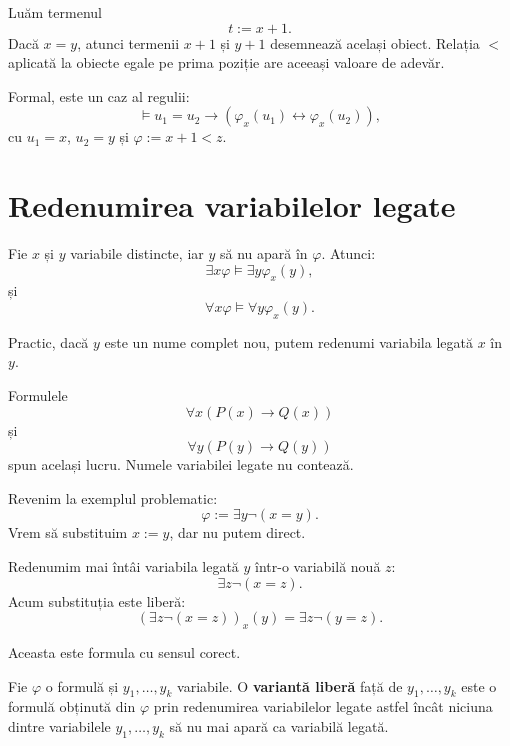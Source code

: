 \begin{solutie}
	Luăm termenul
	\[
		t := x+1.
	\]
	Dacă \(x=y\), atunci termenii \(x+1\) și \(y+1\) desemnează același obiect. Relația \(<\) aplicată la obiecte egale pe prima poziție are aceeași valoare de adevăr.

	Formal, este un caz al regulii:
	\[
		\models u_1=u_2 \to (\varphi_x(u_1) \leftrightarrow \varphi_x(u_2)),
	\]
	cu \(u_1=x\), \(u_2=y\) și \( \varphi := x+1<z \).
\end{solutie}

\section{Redenumirea variabilelor legate}

\begin{prop}
	Fie \(x\) și \(y\) variabile distincte, iar \(y\) să nu apară în \( \varphi \). Atunci:
	\[
		\exists x \varphi \models \exists y \varphi_x(y),
	\]
	și
	\[
		\forall x \varphi \models \forall y \varphi_x(y).
	\]
\end{prop}

Practic, dacă \(y\) este un nume complet nou, putem redenumi variabila legată \(x\) în \(y\).

\begin{eg}
	Formulele
	\[
		\forall x(P(x) \to Q(x))
	\]
	și
	\[
		\forall y(P(y) \to Q(y))
	\]
	spun același lucru. Numele variabilei legate nu contează.
\end{eg}

\begin{eg}
	Revenim la exemplul problematic:
	\[
		\varphi := \exists y \neg(x=y).
	\]
	Vrem să substituim \(x:=y\), dar nu putem direct.

	Redenumim mai întâi variabila legată \(y\) într-o variabilă nouă \(z\):
	\[
		\exists z \neg(x=z).
	\]
	Acum substituția este liberă:
	\[
		(\exists z \neg(x=z))_x(y)=\exists z \neg(y=z).
	\]

	Aceasta este formula cu sensul corect.
\end{eg}

\begin{definition}
	Fie \( \varphi \) o formulă și \(y_1,\dots,y_k\) variabile.
	O \textbf{variantă liberă} față de \(y_1,\dots,y_k\) este o formulă obținută din \( \varphi \) prin redenumirea variabilelor legate astfel încât niciuna dintre variabilele \(y_1,\dots,y_k\) să nu mai apară ca variabilă legată.
\end{definition}

